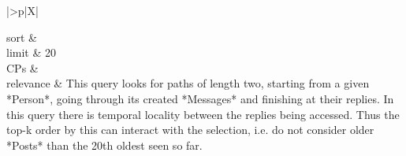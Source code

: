 \begin{tabularx}{\queryCardWidth}{|>{\queryPropertyCell}p{\queryPropertyCellWidth}|X|}
%
	
		sort		&
		\innerCardVSpace \\ \hline
	limit & 20 \\ \hline
	CPs &
	 \\ \hline
	relevance &
		\footnotesize This query looks for paths of length two, starting from a given *Person*, going through its created *Messages* and finishing at their replies. In this query there is temporal locality between the replies being accessed. Thus the top-k order by this can interact with the selection, i.e. do not consider older *Posts* than the 20th oldest seen so far.
 \\ \hline%
\end{tabularx}
\queryCardVSpace

\let\emph\oldemph